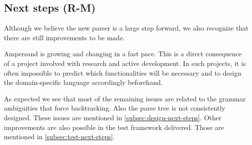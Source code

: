 
\subsection{Next steps (R-M)}
Although we believe the new parser is a large step forward, we also recognize that there are still improvements to be made.

Ampersand is growing and changing in a fast pace.
This is a direct consequence of a project involved with research and active development.
In such projects, it is often impossible to predict which functionalities will be necessary and to design the domain-specific language accordingly beforehand.

As expected we see that most of the remaining issues are related to the grammar ambiguities that force backtracking.
Also the parse tree is not consistently designed.
These issues are mentioned in \autoref{subsec:design-next-steps}.
Other improvements are also possible in the test framework delivered.
Those are mentioned in \autoref{subsec:test-next-steps}.
